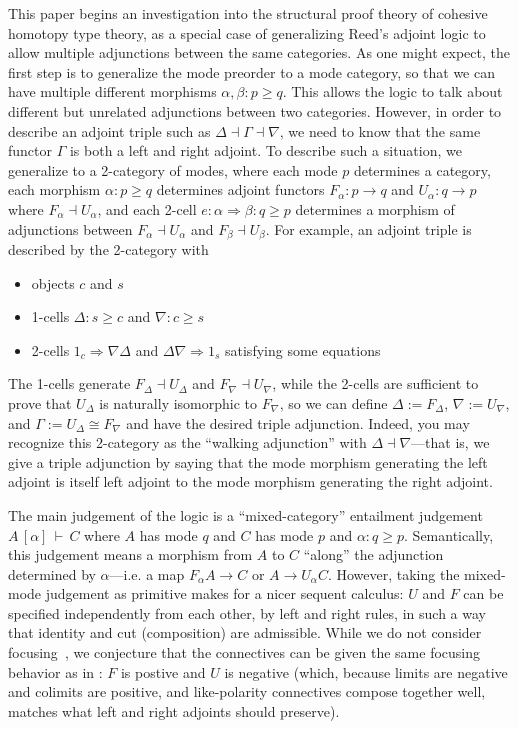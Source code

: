 \documentclass{drl-common/llncs}
\newcommand{\la}{\ensuremath{\dashv}}
\newcommand{\tc}[2]{\ensuremath{#1 \Rightarrow #2}}
\newcommand\seq[3]{\ensuremath{#1 \, [ #2 ] \, \vdash \, #3}}
\begin{document}
This paper begins an investigation into the structural proof theory of
cohesive homotopy type theory, as a special case of generalizing Reed's
adjoint logic to allow multiple adjunctions between the same categories.
As one might expect, the first step is to generalize the mode preorder
to a mode category, so that we can have multiple different morphisms
$\alpha, \beta : p\ge q$.  This allows the logic to talk about different
but unrelated adjunctions between two categories.  However, in order to
describe an adjoint triple such as $\Delta \la \Gamma \la \nabla$, we
need to know that the same functor $\Gamma$ is both a left and right
adjoint.  To describe such a situation, we generalize to a 2-category of
modes, where each mode $p$ determines a category, each morphism $\alpha
: p \ge q$ determines adjoint functors $F_\alpha : p \to q$ and
$U_\alpha : q \to p$ where $F_\alpha \la U_\alpha$, and each 2-cell $e :
\tc \alpha  \beta : q \ge p$ determines a morphism of adjunctions between 
$F_\alpha \la U_\alpha$ and $F_\beta \la U_\beta$.  For example, an
adjoint triple is described by the 2-category with
\begin{itemize}
\item objects $c$ and $s$
\item 1-cells $\Delta : s \ge c$ and $\nabla : c \ge s$
\item 2-cells $\tc {1_c} {\nabla \Delta}$ 
and $\tc {\Delta \nabla} {1_s}$ satisfying 
some equations
\end{itemize}
The 1-cells generate $F_\Delta \la U_\Delta$ and $F_\nabla \la
U_\nabla$, while the 2-cells are sufficient to prove that $U_\Delta$ is
naturally isomorphic to $F_\nabla$, so we can define $\Delta :=
F_\Delta$, $\nabla := U_\nabla$, and $\Gamma := U_\Delta \cong F_\nabla$
and have the desired triple adjunction.  Indeed, you may recognize this
2-category as the ``walking adjunction'' with $\Delta \la \nabla$---that
is, we give a triple adjunction by saying that the mode morphism generating
the left adjoint is itself left adjoint to the mode morphism generating the
right adjoint.

The main judgement of the logic is a ``mixed-category'' entailment
judgement \seq{A}{\alpha}{C} where $A$ has mode $q$ and $C$ has mode $p$
and $\alpha : q \ge p$.  Semantically, this judgement means a morphism
from $A$ to $C$ ``along'' the adjunction determined by $\alpha$---i.e. a
map $F_\alpha A \to C$ or $A \to U_\alpha C$.  However, taking the
mixed-mode judgement as primitive makes for a nicer sequent calculus:
$U$ and $F$ can be specified independently from each other, by left and
right rules, in such a way that identity and cut (composition) are
admissible.  While we do not consider focusing~\citep{andreoli92focus},
we conjecture that the connectives can be given the same focusing
behavior as in \citep{reed09adjoint}: $F$ is postive and $U$ is negative
(which, because limits are negative and colimits are positive, and
like-polarity connectives compose together well, matches what left and
right adjoints should preserve).
\end{document}
